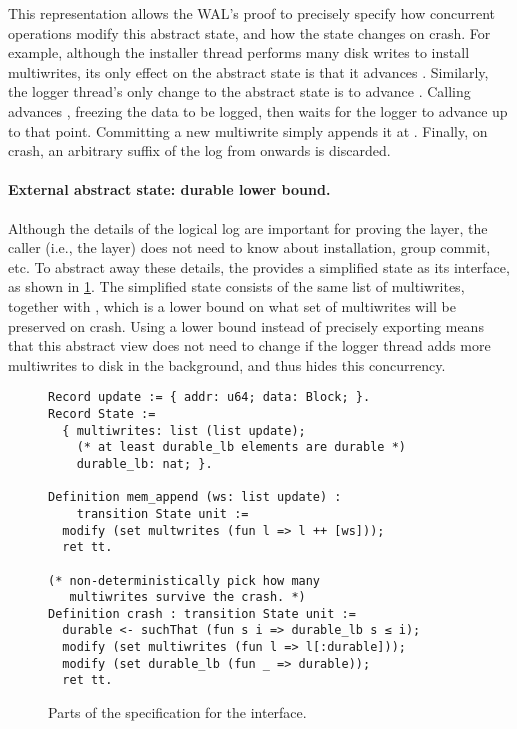 This representation allows the WAL's proof to precisely specify how concurrent
operations modify this abstract state, and how the state changes on crash.
For example, although the installer thread performs many disk writes to
install multiwrites, its only effect on the abstract state is that it
advances .  Similarly, the logger thread's only change to
the abstract state is to advance .  Calling 
advances , freezing the data to be logged, then waits
for the logger to advance  up to that point.  Committing a
new multiwrite simply appends it at .  Finally, on crash,
an arbitrary suffix of the log from  onwards is discarded.


\paragraph{External abstract state: durable lower bound.}
Although the details of the logical log are important for proving the
 layer, the caller (i.e., the  layer) does not need
to know about installation, group commit, etc. To abstract away these
details, the  provides a simplified state as its interface,
as shown in \cref{fig:wal-spec}.  The simplified state consists of
the same list of multiwrites, together with , which is
a lower bound on what set of multiwrites will be preserved on crash.
Using a lower bound instead of precisely exporting  means
that this abstract view does not need to change if the logger thread
adds more multiwrites to disk in the background, and thus hides
this concurrency.

\begin{figure}[ht]
  \begin{verbatim}
Record update := { addr: u64; data: Block; }.
Record State :=
  { multiwrites: list (list update);
    (* at least durable_lb elements are durable *)
    durable_lb: nat; }.

Definition mem_append (ws: list update) :
    transition State unit :=
  modify (set multwrites (fun l => l ++ [ws]));
  ret tt.

(* non-deterministically pick how many
   multiwrites survive the crash. *)
Definition crash : transition State unit :=
  durable <- suchThat (fun s i => durable_lb s ≤ i);
  modify (set multiwrites (fun l => l[:durable]));
  modify (set durable_lb (fun _ => durable));
  ret tt.
  \end{verbatim}
\caption{Parts of the specification for the  interface.}
\label{fig:wal-spec}
\end{figure}


